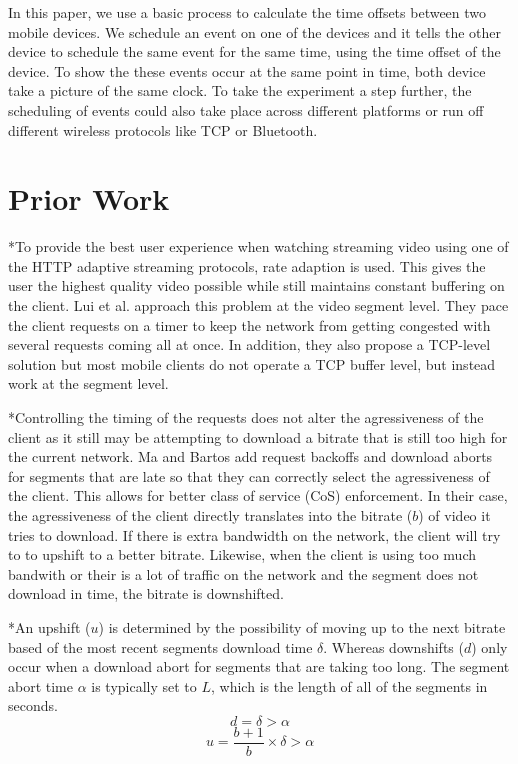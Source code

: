 \documentclass[10pt]{IEEEtran}
\begin{document}
In this paper, we use a basic process to calculate the time offsets between two
mobile devices. We schedule an event on one of the devices and it tells the
other device to schedule the same event for the same time, using the time offset
of the device. To show the these events occur at the same point in time, both
device take a picture of the same clock. To take the experiment a step further,
the scheduling of events could also take place across different platforms or run
off different wireless protocols like TCP or Bluetooth.

\section{Prior Work}

*To provide the best user experience when watching streaming video using one of
the HTTP adaptive streaming protocols, rate adaption is used. This gives the
user the highest quality video possible while still maintains constant buffering
on the client. Lui et al. \cite{rate} approach this problem at the video segment level. 
They pace the client requests on a timer to keep the network from getting
congested with several requests coming all at once. In addition, they also 
propose a TCP-level solution but most mobile clients do not operate a TCP buffer
level, but instead work at the segment level.

*Controlling the timing of the requests does not alter the agressiveness of the
client as it still may be attempting to download a bitrate that is still too
high for the current network. Ma and Bartos \cite{cos} add request backoffs and download 
aborts for segments that are late so that they can correctly select the 
agressiveness of the client. This allows for better class of service (CoS) 
enforcement. In their case, the agressiveness of the client directly translates 
into the bitrate ($b$) of video it tries to download. If there is extra 
bandwidth on the network, the client will try to to upshift to a better bitrate. 
Likewise, when the client is using too much bandwith or their is a lot of 
traffic on the network and the segment does not download in time, the bitrate is 
downshifted.

*An upshift ($u$) is determined by the possibility of moving up to the next bitrate
based of the most recent segments download time $\delta$. Whereas downshifts 
($d$) only occur when a download abort for segments that are taking too long. 
The segment abort time $\alpha$ is typically set to $L$, which is the length of 
all of the segments in seconds.
\begin{equation}
    d = \delta > \alpha
\end {equation}
\begin{equation}
    u = \frac{b+1}{b} \times \delta > \alpha
\end {equation}
\end{document}
